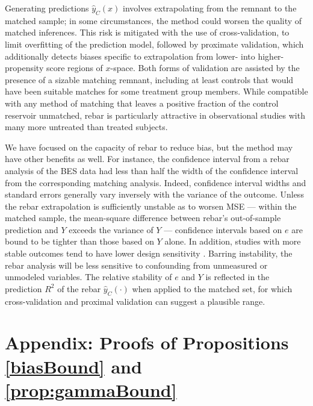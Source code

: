 \documentclass[12pt]{article}\usepackage[]{graphicx}\usepackage[]{color}
\newcommand{\yhat}{\hat{y}_C}
\newcommand{\algorithm}{\hat{y}_C(\cdot)}
\newcommand{\covVec}{x}
\begin{document}
Generating predictions $\yhat (\covVec)$ involves extrapolating from
the remnant to the matched sample; in some circumstances, the method could worsen the
quality of matched inferences. This risk is mitigated with the use of
cross-validation, to limit overfitting of the prediction model,
followed by proximate validation, which additionally detects biases
specific to extrapolation from lower- into higher-propensity score regions of
$\covVec$-space.  Both forms of validation are assisted by the presence of a
sizable matching remnant, including at least controls that would
have been suitable matches for some treatment group members.
While compatible with any method of matching that leaves a positive
fraction of the control reservoir unmatched, rebar is
particularly attractive in observational studies with
many more untreated than treated subjects.


We have focused on the capacity of rebar to reduce bias, but the
method may have other benefits as well.  For instance, the confidence
interval from a rebar analysis of the BES data had less than half the
width of the confidence interval from the corresponding matching
analysis.  Indeed, confidence interval widths and standard errors
generally vary inversely with the variance of the outcome.  Unless the
rebar extrapolation is sufficiently unstable as to worsen MSE ---
within the matched sample, the mean-square difference between rebar's
out-of-sample prediction and $Y$ exceeds the variance of $Y$ ---
confidence intervals based on $e$ are bound to be tighter than those
based on $Y$ alone.  In addition, studies with more stable outcomes
tend to have lower design sensitivity
\citep{rosenbaum2004design,zubizarreta2013effect}.  Barring
instability, the rebar analysis will be less sensitive to confounding
from unmeasured or unmodeled variables.  The relative stability of $e$
and $Y$ is reflected in the prediction $R^2$ of the rebar $\algorithm$
when applied to the matched set, for which cross-validation and
proximal validation can suggest a plausible range.











\section{Appendix: Proofs of Propositions \ref{biasBound} and \ref{prop:gammaBound}}
\end{document}
